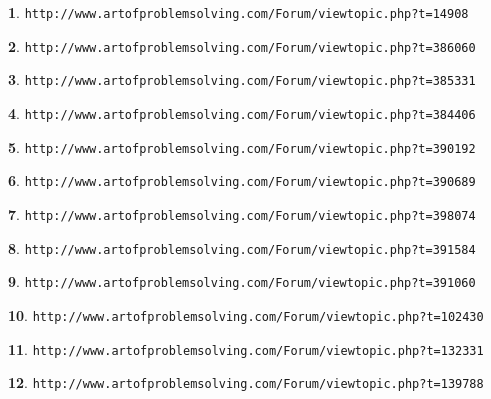 \documentclass{article}
\theoremstyle{definition}
\newtheorem{s}{}
\begin{document}
\begin{s}
\texttt{http://www.artofproblemsolving.com/Forum/viewtopic.php?t=14908}
\end{s}


\begin{s}
\texttt{http://www.artofproblemsolving.com/Forum/viewtopic.php?t=386060}
\end{s}





\begin{s}
\texttt{http://www.artofproblemsolving.com/Forum/viewtopic.php?t=385331}
\end{s}


\begin{s}
\texttt{http://www.artofproblemsolving.com/Forum/viewtopic.php?t=384406}
\end{s}





\begin{s}
\texttt{http://www.artofproblemsolving.com/Forum/viewtopic.php?t=390192}
\end{s}


\begin{s}
\texttt{http://www.artofproblemsolving.com/Forum/viewtopic.php?t=390689}
\end{s}





\begin{s}
\texttt{http://www.artofproblemsolving.com/Forum/viewtopic.php?t=398074}
\end{s}


\begin{s}
\texttt{http://www.artofproblemsolving.com/Forum/viewtopic.php?t=391584}
\end{s}





\begin{s}
\texttt{http://www.artofproblemsolving.com/Forum/viewtopic.php?t=391060}
\end{s}


\begin{s}
\texttt{http://www.artofproblemsolving.com/Forum/viewtopic.php?t=102430}
\end{s}





\begin{s}
\texttt{http://www.artofproblemsolving.com/Forum/viewtopic.php?t=132331}
\end{s}


\begin{s}
\texttt{http://www.artofproblemsolving.com/Forum/viewtopic.php?t=139788}
\end{s}
\end{document}
